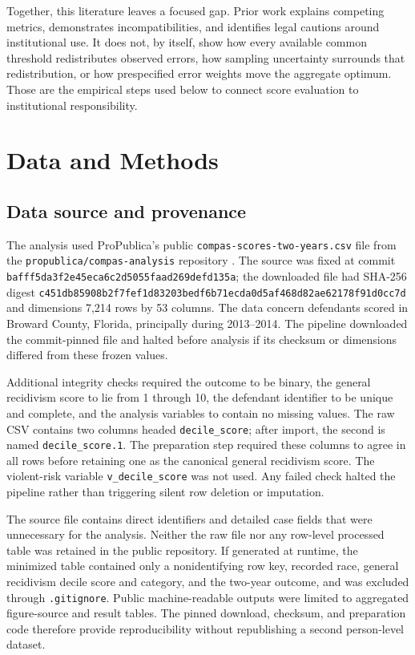 \documentclass[11pt,letterpaper]{article}
\begin{document}
Together, this literature leaves a focused gap. Prior work explains competing metrics, demonstrates incompatibilities, and identifies legal cautions around institutional use. It does not, by itself, show how every available common threshold redistributes observed errors, how sampling uncertainty surrounds that redistribution, or how prespecified error weights move the aggregate optimum. Those are the empirical steps used below to connect score evaluation to institutional responsibility.

\section{Data and Methods}

\subsection{Data source and provenance}

The analysis used ProPublica's public \texttt{compas-scores-two-years.csv} file from the \texttt{propublica/compas-analysis} repository \citep{larson2016}. The source was fixed at commit \texttt{bafff5da3f2e45eca6c2d5055faad269defd135a}; the downloaded file had SHA-256 digest \texttt{c451db85908b2f7fef1d83203bedf6b71ecda0d5af468d82ae62178f91d0cc7d} and dimensions 7,214 rows by 53 columns. The data concern defendants scored in Broward County, Florida, principally during 2013--2014. The pipeline downloaded the commit-pinned file and halted before analysis if its checksum or dimensions differed from these frozen values.

Additional integrity checks required the outcome to be binary, the general recidivism score to lie from 1 through 10, the defendant identifier to be unique and complete, and the analysis variables to contain no missing values. The raw CSV contains two columns headed \texttt{decile\_score}; after import, the second is named \texttt{decile\_score.1}. The preparation step required these columns to agree in all rows before retaining one as the canonical general recidivism score. The violent-risk variable \texttt{v\_decile\_score} was not used. Any failed check halted the pipeline rather than triggering silent row deletion or imputation.

The source file contains direct identifiers and detailed case fields that were unnecessary for the analysis. Neither the raw file nor any row-level processed table was retained in the public repository. If generated at runtime, the minimized table contained only a nonidentifying row key, recorded race, general recidivism decile score and category, and the two-year outcome, and was excluded through \texttt{.gitignore}. Public machine-readable outputs were limited to aggregated figure-source and result tables. The pinned download, checksum, and preparation code therefore provide reproducibility without republishing a second person-level dataset.
\end{document}
